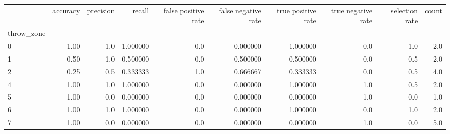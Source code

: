 \begin{tabular}{lrrrrrrrrr}
\toprule
{} &  accuracy &  precision &    recall &  false positive rate &  false negative rate &  true positive rate &  true negative rate &  selection rate &  count \\
throw\_zone &           &            &           &                      &                      &                     &                     &                 &        \\
\midrule
0          &      1.00 &        1.0 &  1.000000 &                  0.0 &             0.000000 &            1.000000 &                 0.0 &             1.0 &    2.0 \\
1          &      0.50 &        1.0 &  0.500000 &                  0.0 &             0.500000 &            0.500000 &                 0.0 &             0.5 &    2.0 \\
2          &      0.25 &        0.5 &  0.333333 &                  1.0 &             0.666667 &            0.333333 &                 0.0 &             0.5 &    4.0 \\
4          &      1.00 &        1.0 &  1.000000 &                  0.0 &             0.000000 &            1.000000 &                 1.0 &             0.5 &    2.0 \\
5          &      1.00 &        0.0 &  0.000000 &                  0.0 &             0.000000 &            0.000000 &                 1.0 &             0.0 &    1.0 \\
6          &      1.00 &        1.0 &  1.000000 &                  0.0 &             0.000000 &            1.000000 &                 0.0 &             1.0 &    2.0 \\
7          &      1.00 &        0.0 &  0.000000 &                  0.0 &             0.000000 &            0.000000 &                 1.0 &             0.0 &    5.0 \\
\bottomrule
\end{tabular}
